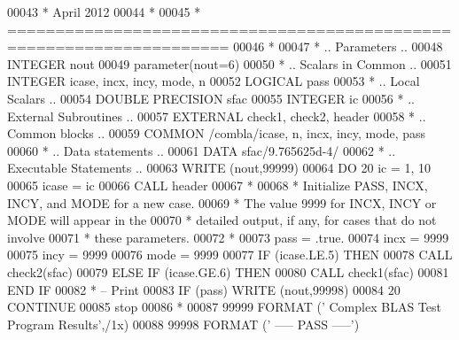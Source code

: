 \begin{DoxyCode}
00043 \textcolor{comment}{*     April 2012}
00044 \textcolor{comment}{*}
00045 \textcolor{comment}{*  =====================================================================}
00046 \textcolor{comment}{*}
00047 \textcolor{comment}{*     .. Parameters ..}
00048       \textcolor{keywordtype}{INTEGER}          nout
00049       parameter(nout=6)
00050 \textcolor{comment}{*     .. Scalars in Common ..}
00051       \textcolor{keywordtype}{INTEGER}          icase, incx, incy, mode, n
00052       \textcolor{keywordtype}{LOGICAL}          pass
00053 \textcolor{comment}{*     .. Local Scalars ..}
00054       \textcolor{keywordtype}{DOUBLE PRECISION} sfac
00055       \textcolor{keywordtype}{INTEGER}          ic
00056 \textcolor{comment}{*     .. External Subroutines ..}
00057       \textcolor{keywordtype}{EXTERNAL}         check1, check2, header
00058 \textcolor{comment}{*     .. Common blocks ..}
00059       \textcolor{keyword}{COMMON}           /combla/icase, n, incx, incy, mode, pass
00060 \textcolor{comment}{*     .. Data statements ..}
00061       \textcolor{keyword}{DATA}             sfac/9.765625d-4/
00062 \textcolor{comment}{*     .. Executable Statements ..}
00063       \textcolor{keyword}{WRITE} (nout,99999)
00064       \textcolor{keywordflow}{DO} 20 ic = 1, 10
00065          icase = ic
00066          \textcolor{keyword}{CALL }header
00067 \textcolor{comment}{*}
00068 \textcolor{comment}{*        Initialize PASS, INCX, INCY, and MODE for a new case.}
00069 \textcolor{comment}{*        The value 9999 for INCX, INCY or MODE will appear in the}
00070 \textcolor{comment}{*        detailed  output, if any, for cases that do not involve}
00071 \textcolor{comment}{*        these parameters.}
00072 \textcolor{comment}{*}
00073          pass = .true.
00074          incx = 9999
00075          incy = 9999
00076          mode = 9999
00077          \textcolor{keywordflow}{IF} (icase.LE.5) \textcolor{keywordflow}{THEN}
00078             \textcolor{keyword}{CALL }check2(sfac)
00079          \textcolor{keywordflow}{ELSE} \textcolor{keywordflow}{IF} (icase.GE.6) \textcolor{keywordflow}{THEN}
00080             \textcolor{keyword}{CALL }check1(sfac)
00081 \textcolor{keywordflow}{         END IF}
00082 \textcolor{comment}{*        -- Print}
00083          \textcolor{keywordflow}{IF} (pass) \textcolor{keyword}{WRITE} (nout,99998)
00084    20 \textcolor{keywordflow}{CONTINUE}
00085       stop
00086 \textcolor{comment}{*}
00087 99999 \textcolor{keyword}{FORMAT} (\textcolor{stringliteral}{' Complex BLAS Test Program Results'},/1x)
00088 99998 \textcolor{keyword}{FORMAT} (\textcolor{stringliteral}{'                                    ----- PASS -----'})

\end{DoxyCode}
